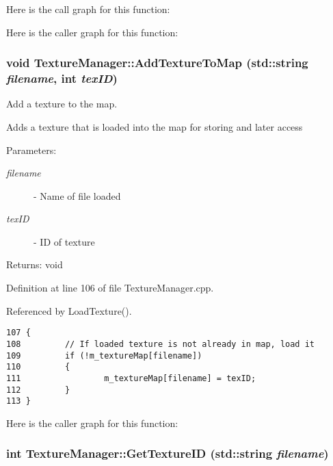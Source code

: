 Here is the call graph for this function:

Here is the caller graph for this function:\hypertarget{class_texture_manager_6e3172f00d0eacef527ee64a0a76622f}{
\subsubsection[AddTextureToMap]{\setlength{\rightskip}{0pt plus 5cm}void TextureManager::AddTextureToMap (std::string {\em filename}, \/  int {\em texID})}}
\label{class_texture_manager_6e3172f00d0eacef527ee64a0a76622f}


Add a texture to the map. 

Adds a texture that is loaded into the map for storing and later access

\begin{Desc}
\item[Parameters:]
\begin{description}
\item[{\em filename}]- Name of file loaded \item[{\em texID}]- ID of texture\end{description}
\end{Desc}
\begin{Desc}
\item[Returns:]void \end{Desc}


Definition at line 106 of file TextureManager.cpp.

Referenced by LoadTexture().

\begin{Code}\begin{verbatim}107 {
108         // If loaded texture is not already in map, load it
109         if (!m_textureMap[filename])
110         {
111                 m_textureMap[filename] = texID;
112         }
113 }
\end{verbatim}
\end{Code}




Here is the caller graph for this function:\hypertarget{class_texture_manager_5dbb010f1a5779a8231e3aa02c1ccc0e}{
\subsubsection[GetTextureID]{\setlength{\rightskip}{0pt plus 5cm}int TextureManager::GetTextureID (std::string {\em filename})}}
\label{class_texture_manager_5dbb010f1a5779a8231e3aa02c1ccc0e}


